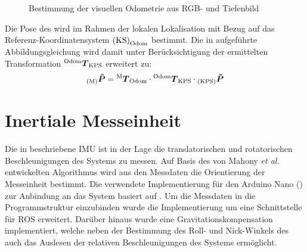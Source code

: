 \begin{figure}[!ht]
	\begin{center}
	\hspace{5mm}
	\caption{Bestimmung der visuellen Odometrie aus RGB- und Tiefenbild}
	\label{fig.fovis}
	\end{center}
\end{figure}

Die Pose des  wird im Rahmen der lokalen Lokalisation mit Bezug auf das Referenz-Koordinatensystem ${\mathrm{(KS)}}_{\mathrm{Odom}}$ bestimmt. Die in  aufgeführte Abbildungsgleichung wird damit unter Berücksichtigung der ermittelten Transformation ${^{\mathrm{Odom}}\mbox{\boldmath{$T$}}_{\mathrm{KPS}}}$ erweitert zu:
%
\begin{equation}
{_{{\mathrm{(M)}}}}\mbox{\boldmath{$\tilde{P}$}} = {^{\mathrm{M}}\mbox{\boldmath{$T$}}_{\mathrm{Odom}}} \cdot {^{\mathrm{Odom}}\mbox{\boldmath{$T$}}_{\mathrm{KPS}}} \cdot {_{{\mathrm{(KPS)}}}}\mbox{\boldmath{$\tilde{P}$}}
\label{eq.locloc}
\end{equation}

\prever{
}
\prever{
}
\section{Inertiale Messeinheit}
Die in  beschriebene IMU ist in der Lage die translatorischen und rotatorischen Beschleunigungen des Systems zu messen. Auf Basis des von Mahony \textit{et al.} \cite{Mahony2008} entwickelten Algorithmus wird aus den Messdaten die Orientierung der Messeinheit bestimmt. Die verwendete Implementierung für den Arduino Nano () zur Anbindung an das System basiert auf \cite{IMUCode}. Um die Messdaten in die Programmstruktur einzubinden wurde die Implementierung um eine Schnittstelle für ROS erweitert. Darüber hinaus wurde eine Gravitationskompensation implementiert, welche neben der Bestimmung des Roll- und Nick-Winkels des  auch das Auslesen der relativen Beschleunigungen des Systems ermöglicht.\\

